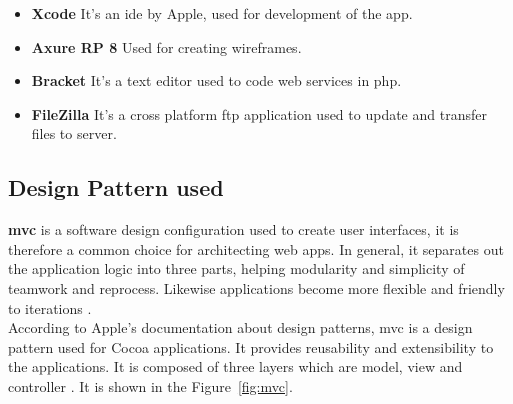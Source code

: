 \begin{itemize}
    \item \textbf{Xcode}
    It's an \gls{ide} by Apple, used for development of the app. \\
    
    \item \textbf{Axure RP 8}
    Used for creating wireframes. \\
    
    \item \textbf{Bracket}
    It's a text editor used to code web services in \gls{php}. \\
    
    \item \textbf{FileZilla}
    It's a cross platform \gls{ftp} application used to update and transfer files to server. \\
    
\end{itemize}


\subsection{Design Pattern used}

\textbf{\gls{mvc}} is a software design configuration used to create user interfaces, it is therefore a common choice for architecting web apps. In general, it separates out the application logic into three parts, helping modularity and simplicity of teamwork and reprocess. Likewise applications become more flexible and friendly to iterations \cite{MVC}. \\
According to Apple's documentation about design patterns, \gls{mvc} is a design pattern used for Cocoa applications. It provides reusability and extensibility to the applications. It is composed of three layers which are model, view and controller \cite{MVC_Apple}. It is shown in the Figure~\ref{fig:mvc}.

